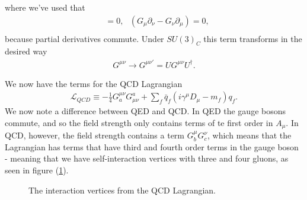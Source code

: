 \documentclass[11pt]{article}
\begin{document}
\begin{multicols}{2}
\begin{flushleft}
where we've used that
\begin{align*}
[\partial_{\mu}, \partial_{\nu}] &= 0, \text{ } (G_{\mu} \partial_{\nu}- G_{\nu} \partial_{\mu})=0,\\
\end{align*}
because partial derivatives commute. Under $SU(3)_C$ this term transforms in the desired way
\begin{align*}
G^{\mu \nu} \rightarrow G^{\mu \nu '} = U G^{\mu \nu} U^{\dagger}.
\end{align*}
\end{flushleft}

\begin{flushleft}
We now have the terms for the QCD Lagrangian 
\begin{align}
\mathcal{L}_{QCD} \equiv - \frac{1}{4} G^{\mu \nu}_a G^a_{\mu \nu} + \sum_f \bar{q}_f (i \gamma^{\mu} D_{\mu} -m_f)q_f.
\end{align}
We now note a difference between QED and QCD. In QED the gauge bosons commute, and so the field strength only contains terms of te first order in $A_{\mu}$. In QCD, however, the field strength contains a term $G^{\mu}_b G^{\nu}_c$, which means that the Lagrangian has terms that have third and fourth order terms in the gauge boson - meaning that we have self-interaction vertices with three and four gluons, as seen in figure (\ref{QCD vertices}).
 
\begin{figure}[H]
\caption{The interaction vertices from the QCD Lagrangian.}
\label{QCD vertices}
\end{figure}
\end{flushleft}


\end{multicols}
\end{document}
